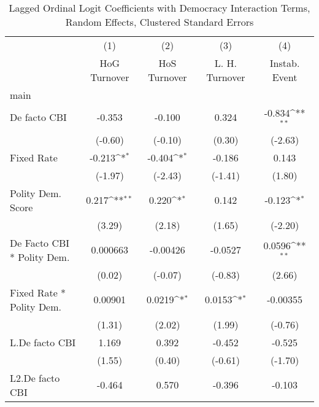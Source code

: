 {
\def\sym#1{\ifmmode^{#1}\else\(^{#1}\)\fi}
\begin{longtable}{l*{4}{c}}
\caption{Lagged Ordinal Logit Coefficients with Democracy Interaction Terms, Random Effects, Clustered Standard Errors \label{demintlagordLogLogDF}}\\
\hline\hline\endfirsthead\hline\endhead\hline\endfoot\endlastfoot
                &\multicolumn{1}{c}{(1)}&\multicolumn{1}{c}{(2)}&\multicolumn{1}{c}{(3)}&\multicolumn{1}{c}{(4)}\\
                &\multicolumn{1}{c}{HoG Turnover}&\multicolumn{1}{c}{HoS Turnover}&\multicolumn{1}{c}{L. H. Turnover}&\multicolumn{1}{c}{Instab. Event}\\
\hline
main            &                  &                  &                  &                  \\
De facto CBI    &   -0.353         &   -0.100         &    0.324         &   -0.834\sym{**} \\
                &  (-0.60)         &  (-0.10)         &   (0.30)         &  (-2.63)         \\
[1em]
Fixed Rate      &   -0.213\sym{*}  &   -0.404\sym{*}  &   -0.186         &    0.143         \\
                &  (-1.97)         &  (-2.43)         &  (-1.41)         &   (1.80)         \\
[1em]
Polity Dem. Score&    0.217\sym{**} &    0.220\sym{*}  &    0.142         &   -0.123\sym{*}  \\
                &   (3.29)         &   (2.18)         &   (1.65)         &  (-2.20)         \\
[1em]
De Facto CBI * Polity Dem.& 0.000663         & -0.00426         &  -0.0527         &   0.0596\sym{**} \\
                &   (0.02)         &  (-0.07)         &  (-0.83)         &   (2.66)         \\
[1em]
Fixed Rate * Polity Dem.&  0.00901         &   0.0219\sym{*}  &   0.0153\sym{*}  & -0.00355         \\
                &   (1.31)         &   (2.02)         &   (1.99)         &  (-0.76)         \\
[1em]
L.De facto CBI  &    1.169         &    0.392         &   -0.452         &   -0.525         \\
                &   (1.55)         &   (0.40)         &  (-0.61)         &  (-1.70)         \\
[1em]
L2.De facto CBI &   -0.464         &    0.570         &   -0.396         &   -0.103         \\

\end{longtable}}

